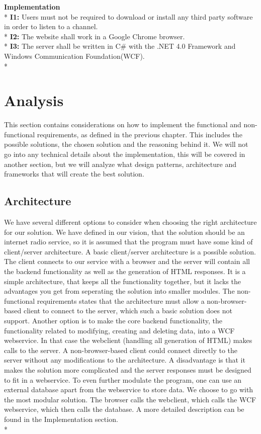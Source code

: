 \documentclass[a4paper,11pt,report]{article}
\begin{document}
\textbf{Implementation} \\*
\textbf{I1:} Users must not be required to download or install any third party software in order to listen to a channel. \\*
\textbf{I2:} The website shall work in a Google Chrome browser. \\*
\textbf{I3:} The server shall be written in C\# with the .NET 4.0 Framework and Windows Communication Foundation(WCF). \\*

\section{Analysis}
This section contains considerations on how to implement the functional and non-functional requirements, as defined in the previous chapter. This includes the possible solutions, the chosen solution and the reasoning behind it. We will not go into any technical details about the implementation, this will be covered in another section, but we will analyze what design patterns, architecture and frameworks that will create the best solution. 

\subsection{Architecture}
We have several different options to consider when choosing the right architecture for our solution. We have defined in our vision, that the solution should be an internet radio service, so it is assumed that the program must have some kind of client/server architecture. A basic client/server architecture is a possible solution. The client connects to our service with a browser and the server will contain all the backend functionality as well as the generation of HTML responses. It is a simple architecture, that keeps all the functionality together, but it lacks the advantages you get from seperating the solution into smaller modules. The non-functional requirements states that the architecture must allow a non-browser-based client to connect to the server, which such a basic solution does not support. Another option is to make the core backend functionality, the functionality related to modifying, creating and deleting data, into a WCF webservice. In that case the webclient (handling all generation of HTML) makes calls to the server. A non-browser-based client could connect directly to the server without any modifications to the architecture. A disadvantage is that it makes the solution more complicated and the server responses must be designed to fit in a webservice. To even further modulate the program, one can use an external database apart from the webservice to store data. We choose to go with the most modular solution. The browser calls the webclient, which calls the WCF webservice, which then calls the database. A more detailed description can be found in the Implementation section. \\*
\end{document}
